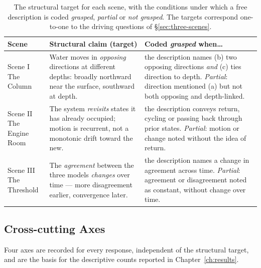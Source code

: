 \begin{table}[htbp]
\centering
\caption[Structural coding targets by scene]{The structural target for each scene, with the conditions under which a free description is coded \emph{grasped}, \emph{partial} or \emph{not grasped}. The targets correspond one-to-one to the driving questions of \S\ref{sec:three-scenes}.}
\label{tab:coding-targets}
\small
\renewcommand{\arraystretch}{1.35}
\begin{tabularx}{\textwidth}{@{}p{2.5cm} X X@{}}
\toprule
\textbf{Scene} &
\textbf{Structural claim (target)} &
\textbf{Coded \emph{grasped} when\ldots} \\
\midrule

\makecell[l]{Scene I\\The Column} &
Water moves in \emph{opposing} directions at different depths: broadly northward near the surface, southward at depth. &
the description names (b) two opposing directions \emph{and} (c) ties direction to depth. \emph{Partial}: direction mentioned (a) but not both opposing and depth-linked. \\

\makecell[l]{Scene II\\The Engine Room} &
The system \emph{revisits} states it has already occupied; motion is recurrent, not a monotonic drift toward the new. &
the description conveys return, cycling or passing back through prior states. \emph{Partial}: motion or change noted without the idea of return. \\

\makecell[l]{Scene III\\The Threshold} &
The \emph{agreement} between the three models \emph{changes} over time --- more disagreement earlier, convergence later. &
the description names a change in agreement across time. \emph{Partial}: agreement or disagreement noted as constant, without change over time. \\

\bottomrule
\end{tabularx}
\end{table}

\subsection{Cross-cutting Axes}
\label{subsec:app-axes}

Four axes are recorded for every response, independent of the structural target, and are the basis for the descriptive counts reported in Chapter~\ref{ch:results}.

